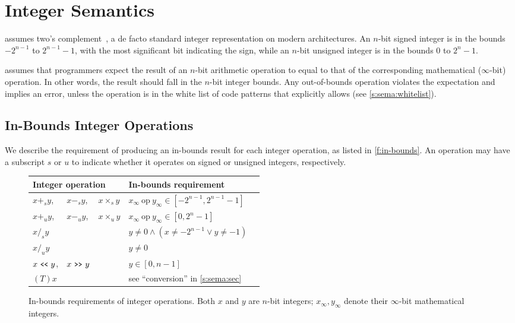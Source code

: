 \section{Integer Semantics}
\label{s:sema}

\sys assumes two's complement~\cite[4.2.1]{intel:vol1},
a de facto standard integer representation on modern architectures.
An $n$-bit signed integer is in the bounds $-2^{n-1}$ to $2^{n-1}-1$,
with the most significant bit indicating the sign,
while an $n$-bit unsigned integer is in the bounds $0$ to $2^n-1$.

\sys assumes that programmers expect the result of an $n$-bit
arithmetic operation to equal to that of the corresponding mathematical
($\infty$-bit) operation.
In other words, the result should fall in the $n$-bit integer bounds.
%
Any out-of-bounds operation violates the expectation and implies an
error, unless the operation is in the white list of code patterns
that \sys explicitly allows (see \autoref{s:sema:whitelist}).

\subsection{In-Bounds Integer Operations}
\label{s:sema:sec}

We describe the requirement of producing an in-bounds result for each
integer operation, as listed in \autoref{f:in-bounds}.
%
An operation may have a subscript $s$ or $u$ to indicate whether
it operates on signed or unsigned integers, respectively.

\begin{figure}
\small
\centering
\begin{tabular}{l@{ }l@{ }lll}\toprule
\multicolumn{3}{l}{Integer operation} & In-bounds requirement \\
\midrule
$x +_s y$, & $x -_s y$, & $x \times_s y$
& $x_{\infty}\ \textrm{op}\ y_{\infty} \in [-2^{n-1}, 2^{n-1}-1]$
\\
$x +_u y$, & $x -_u y$, & $x \times_u y$
& $x_{\infty}\ \textrm{op}\ y_{\infty} \in [0, 2^n-1]$
\\
$x /_s y$ & &
& $y \neq 0 \land (x \neq -2^{n-1} \lor y \neq -1) $
\\
$x /_u y$ & &
& $y \neq 0$
\\
$ x \shl y$, & $x \shr y$ &
& $y \in [0, n-1]$
\\
$(T)x$ & &
& see ``conversion'' in \autoref{s:sema:sec}
\\
\bottomrule
\end{tabular}
\caption{In-bounds requirements of integer operations.
Both $x$ and $y$ are $n$-bit integers; $x_{\infty}, y_{\infty}$
denote their $\infty$-bit mathematical integers.}
\label{f:in-bounds}
\end{figure}

